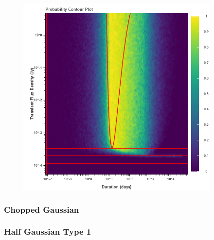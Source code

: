 \documentclass{article}
\begin{document}
\begin{figure}[H] 
	\begin{center}
		\includegraphics[width=4in]{output_gaussian_ProbContour.png}
		
		\label{gaussian}
	\end{center}
\end{figure}
\subsubsection{Chopped Gaussian}
\subsubsection{Half Gaussian Type 1}
\end{document}
